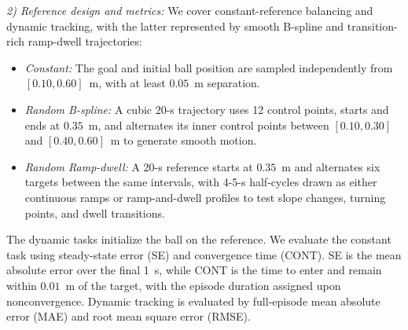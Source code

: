 \documentclass[letterpaper, 10 pt, conference]{ieeeconf}  %
\begin{document}
\textit{2) Reference design and metrics:}
We cover constant-reference balancing and dynamic tracking, with the latter represented by smooth B-spline and
transition-rich ramp-dwell trajectories:
\begin{itemize}
    \setlength{\itemsep}{0pt}
    \setlength{\parsep}{0pt}
    \setlength{\topsep}{2pt}
    \item \emph{Constant:} The goal and initial ball position are sampled independently from $[0.10,0.60]$~m,
    with at least $0.05$~m separation.
    \item \emph{Random B-spline:} A cubic 20-s trajectory uses 12 control points, starts and ends at $0.35$~m,
    and alternates its inner control points between $[0.10,0.30]$ and $[0.40,0.60]$~m to generate smooth motion.
    \item \emph{Random Ramp-dwell:} A 20-s reference starts at $0.35$~m and alternates six targets between the
    same intervals, with 4-5-s half-cycles drawn as either continuous ramps or ramp-and-dwell profiles to test
    slope changes, turning points, and dwell transitions.
\end{itemize}
The dynamic tasks initialize the ball on the reference. We evaluate the constant task using steady-state error
(SE) and convergence time (CONT). SE is the mean absolute error over the final 1~s, while CONT is the time to
enter and remain within $0.01$~m of the target, with the episode duration assigned upon nonconvergence. Dynamic
tracking is evaluated by full-episode mean absolute error (MAE) and root mean square error (RMSE).
\end{document}
